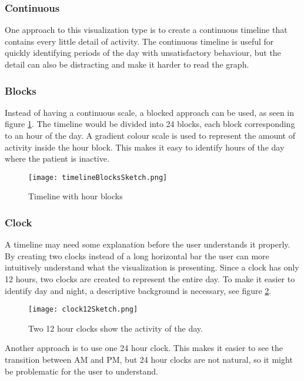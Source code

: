 \subsubsection{Continuous}
One approach to this visualization type is to create a continuous timeline that contains every little detail of activity. The continuous timeline is useful for quickly identifying periods of the day with unsatisfactory behaviour, but the detail can also be distracting and make it harder to read the graph.

\subsubsection{Blocks}
Instead of having a continuous scale, a blocked approach can be used, as seen in figure \ref{fig:timelineBlocks}. The timeline would be divided into 24 blocks, each block corresponding to an hour of the day. A gradient colour scale is used to represent the amount of activity inside the hour block. This makes it easy to identify hours of the day where the patient is inactive. 

\begin{figure}[h!]
	\centering
		\texttt{[image: timelineBlocksSketch.png]}
		\caption{\footnotesize Timeline with hour blocks}
		\label{fig:timelineBlocks}
\end{figure}

\subsubsection{Clock}
A timeline may need some explanation before the user understands it properly. By creating two clocks instead of a long horizontal bar the user can more intuitively understand what the visualization is presenting. Since a clock has only 12 hours, two clocks are created to represent the entire day. To make it easier to identify day and night, a descriptive background is necessary, see figure \ref{fig:clock12}.

\begin{figure}[h!]
	\centering
		\texttt{[image: clock12Sketch.png]}
		\caption{\footnotesize Two 12 hour clocks show the activity of the day.}
		\label{fig:clock12}
\end{figure}

Another approach is to use one 24 hour clock. This makes it easier to see the transition between AM and PM, but 24 hour clocks are not natural, so it might be problematic for the user to understand.

